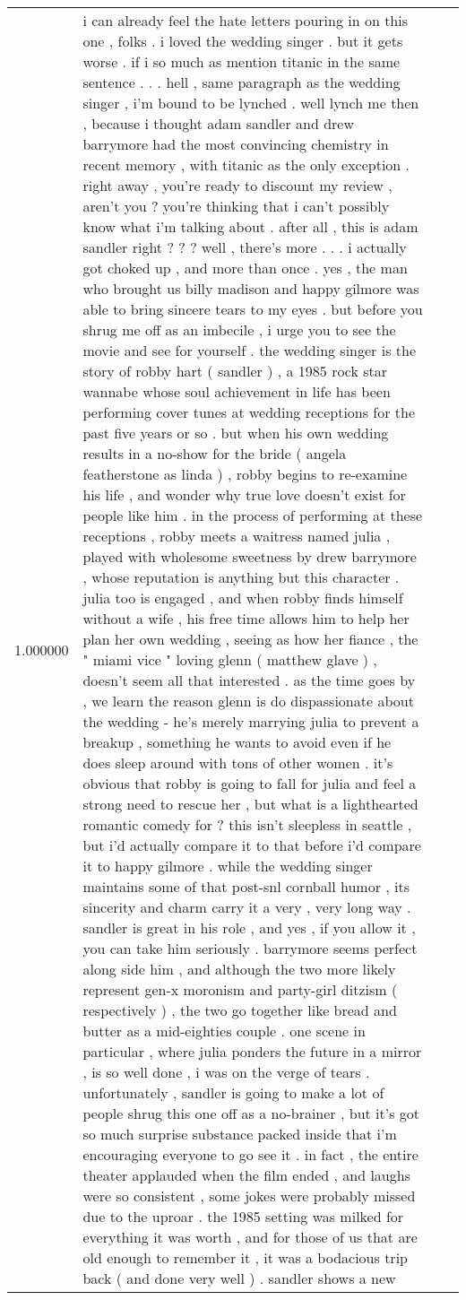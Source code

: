 \begin{tabular}{r{1cm} p{0.4in} r{1cm} p{0.4in}}
1.000000 & i can already feel the hate letters pouring in on this one , folks .  i loved the wedding singer .  but it gets worse .  if i so much as mention titanic in the same sentence .   .   .  hell , same paragraph as the wedding singer , i'm bound to be lynched .  well lynch me then , because i thought adam sandler and drew barrymore had the most convincing chemistry in recent memory , with titanic as the only exception .  right away , you're ready to discount my review , aren't you ?  you're thinking that i can't possibly know what i'm talking about .  after all , this is adam sandler right ? ? ?  well , there's more .   .   .  i actually got choked up , and more than once .  yes , the man who brought us billy madison and happy gilmore was able to bring sincere tears to my eyes .  but before you shrug me off as an imbecile , i urge you to see the movie and see for yourself .  the wedding singer is the story of robby hart ( sandler ) , a 1985 rock star wannabe whose soul achievement in life has been performing cover tunes at wedding receptions for the past five years or so .  but when his own wedding results in a no-show for the bride ( angela featherstone as linda ) , robby begins to re-examine his life , and wonder why true love doesn't exist for people like him .  in the process of performing at these receptions , robby meets a waitress named julia , played with wholesome sweetness by drew barrymore , whose reputation is anything but this character .  julia too is engaged , and when robby finds himself without a wife , his free time allows him to help her plan her own wedding , seeing as how her fiance , the " miami vice " loving glenn ( matthew glave ) , doesn't seem all that interested .  as the time goes by , we learn the reason glenn is do dispassionate about the wedding - he's merely marrying julia to prevent a breakup , something he wants to avoid even if he does sleep around with tons of other women .  it's obvious that robby is going to fall for julia and feel a strong need to rescue her , but what is a lighthearted romantic comedy for ?  this isn't sleepless in seattle , but i'd actually compare it to that before i'd compare it to happy gilmore .  while the wedding singer maintains some of that post-snl cornball humor , its sincerity and charm carry it a very , very long way .  sandler is great in his role , and yes , if you allow it , you can take him seriously .  barrymore seems perfect along side him , and although the two more likely represent gen-x moronism and party-girl ditzism ( respectively ) , the two go together like bread and butter as a mid-eighties couple .  one scene in particular , where julia ponders the future in a mirror , is so well done , i was on the verge of tears .  unfortunately , sandler is going to make a lot of people shrug this one off as a no-brainer , but it's got so much surprise substance packed inside that i'm encouraging everyone to go see it .  in fact , the entire theater applauded when the film ended , and laughs were so consistent , some jokes were probably missed due to the uproar .  the 1985 setting was milked for everything it was worth , and for those of us that are old enough to remember it , it was a bodacious trip back ( and done very well ) .  sandler shows a new 
\end{tabular}

